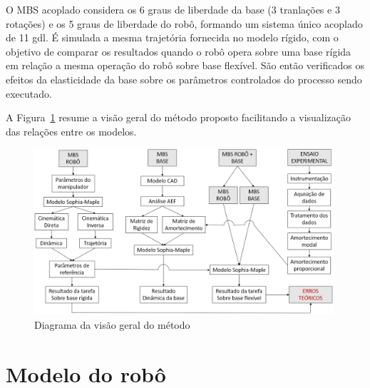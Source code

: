 O MBS acoplado considera os 6 graus de liberdade da base (3 tranlações e 3
rotações) e os 5 graus de liberdade do robô, formando um sistema único acoplado
de 11 gdl. É simulada a mesma trajetória fornecida no modelo rígido, com o
objetivo de comparar os resultados quando o robô opera sobre uma base rígida em
relação a mesma operação do robô sobre base flexível. São então verificados os
efeitos da elasticidade da base sobre os parâmetros controlados do processo
sendo executado.

A Figura~\ref{fig::visgeral} resume a visão geral
do método proposto facilitando a visualização das relações entre os modelos.

\begin{figure}[h]
	\centering 
 	\includegraphics[width=0.99\textwidth]{figs/visgeral}
 	\caption{Diagrama da visão geral do método}
 	\label{fig::visgeral}
\end{figure}



\section{Modelo do robô} \label{sec::robo}


